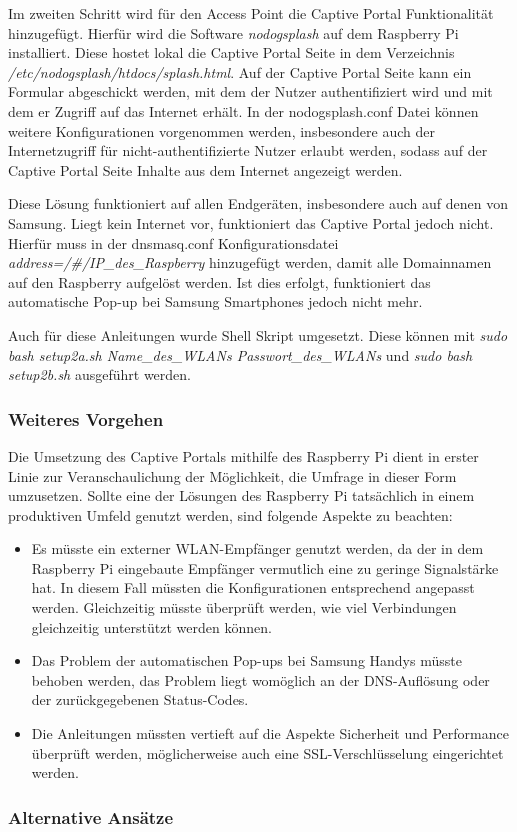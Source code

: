 Im zweiten Schritt wird für den Access Point die Captive Portal Funktionalität hinzugefügt. Hierfür wird die Software \textit{nodogsplash} auf dem Raspberry Pi installiert. Diese hostet lokal die Captive Portal Seite in dem Verzeichnis \textit{/etc/nodogsplash/htdocs/splash.html}. Auf der Captive Portal Seite kann ein Formular abgeschickt werden, mit dem der Nutzer authentifiziert wird und mit dem er Zugriff auf das Internet erhält. In der nodogsplash.conf Datei können weitere Konfigurationen vorgenommen werden, insbesondere auch der Internetzugriff für nicht-authentifizierte Nutzer erlaubt werden, sodass auf der Captive Portal Seite Inhalte aus dem Internet angezeigt werden.

Diese Lösung funktioniert auf allen Endgeräten, insbesondere auch auf denen von Samsung. Liegt kein Internet vor, funktioniert das Captive Portal jedoch nicht. Hierfür muss in der dnsmasq.conf Konfigurationsdatei \textit{address=/\#/IP\_des\_Raspberry} hinzugefügt werden, damit alle Domainnamen auf den Raspberry aufgelöst werden. Ist dies erfolgt, funktioniert das automatische Pop-up bei Samsung Smartphones jedoch nicht mehr.

Auch für diese Anleitungen wurde Shell Skript umgesetzt. Diese können mit \textit{sudo bash setup2a.sh Name\_des\_WLANs Passwort\_des\_WLANs} und \textit{sudo bash setup2b.sh} ausgeführt werden.

\subsubsection*{Weiteres Vorgehen}
Die Umsetzung des Captive Portals mithilfe des Raspberry Pi dient in erster Linie zur Veranschaulichung der Möglichkeit, die Umfrage in dieser Form umzusetzen. Sollte eine der Lösungen des Raspberry Pi tatsächlich in einem produktiven Umfeld genutzt werden, sind folgende Aspekte zu beachten:
\begin{itemize}
\item Es müsste ein externer WLAN-Empfänger genutzt werden, da der in dem Raspberry Pi eingebaute Empfänger vermutlich eine zu geringe Signalstärke hat. In diesem Fall müssten die Konfigurationen entsprechend angepasst werden. Gleichzeitig müsste überprüft werden, wie viel Verbindungen gleichzeitig unterstützt werden können.
\item Das Problem der automatischen Pop-ups bei Samsung Handys müsste behoben werden, das Problem liegt womöglich an der DNS-Auflösung oder der zurückgegebenen Status-Codes.
\item Die Anleitungen müssten vertieft auf die Aspekte Sicherheit und Performance überprüft werden, möglicherweise auch eine SSL-Verschlüsselung eingerichtet werden.

\end{itemize}

\subsubsection{Alternative Ansätze}

